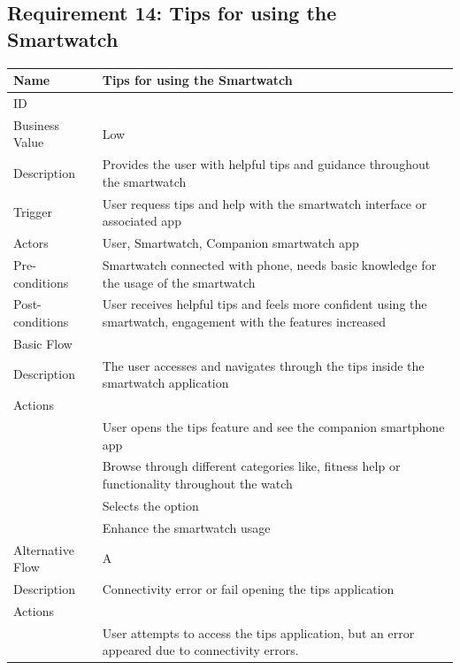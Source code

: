 \documentclass{article}
\begin{document}
\subsection{Requirement 14: Tips for using the Smartwatch}
	\begin{center}
		\begin{tabularx}{1.0\textwidth}{|>{\raggedright\arraybackslash}p{}|>{\raggedright\arraybackslash}X|}
			\hline
			Name             & Tips for using the Smartwatch \\ \hline
			ID               & 14 \\ \hline
			Business Value   & Low \\ \hline
			Description      & Provides the user with helpful tips and guidance throughout the smartwatch \\ \hline
			Trigger          & User requess tips and help with the smartwatch interface or associated app \\ \hline
			Actors           & User, Smartwatch, Companion smartwatch app \\ \hline
			Pre-conditions   & Smartwatch connected with phone, needs basic knowledge for the usage of the smartwatch \\ \hline
			Post-conditions  & User receives helpful tips and feels more confident using the smartwatch, engagement with the features increased \\ \hline
			Basic Flow       & \\ \hline
							Description & The user accesses and navigates through the tips inside the smartwatch application \\ \hline
							Actions & \\ \hline
							1 & User opens the tips feature and see the companion smartphone app \\ \hline
							2 & Browse through different categories like, fitness help or functionality throughout the watch \\ \hline
							3 & Selects the option \\ \hline
							4 & Enhance the smartwatch usage \\ \hline
			Alternative Flow & A \\ \hline
							Description & Connectivity error or fail opening the tips application \\ \hline
							Actions & \\ \hline
							1 & User attempts to access the tips application, but an error appeared due to connectivity errors. \\ \hline

\end{tabularx}
\end{center}
\end{document}
